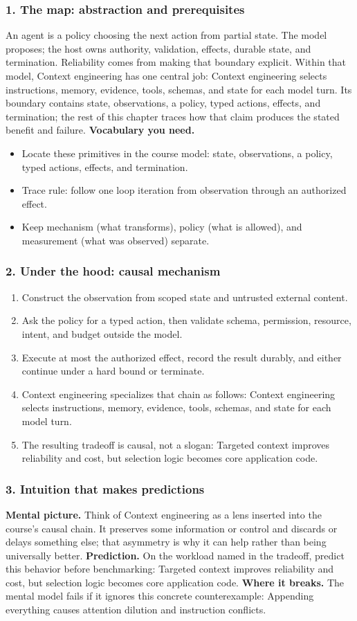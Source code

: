 \subsubsection*{1. The map: abstraction and prerequisites}
An agent is a policy choosing the next action from partial state. The model proposes; the host owns authority, validation, effects, durable state, and termination. Reliability comes from making that boundary explicit.
Within that model, Context engineering has one central job: Context engineering selects instructions, memory, evidence, tools, schemas, and state for each model turn. Its boundary contains state, observations, a policy, typed actions, effects, and termination; the rest of this chapter traces how that claim produces the stated benefit and failure.
\textbf{Vocabulary you need.}\begin{itemize}
\item Locate these primitives in the course model: state, observations, a policy, typed actions, effects, and termination.
\item Trace rule: follow one loop iteration from observation through an authorized effect.
\item Keep mechanism (what transforms), policy (what is allowed), and measurement (what was observed) separate.
\end{itemize}
\subsubsection*{2. Under the hood: causal mechanism}\begin{enumerate}
\item Construct the observation from scoped state and untrusted external content.
\item Ask the policy for a typed action, then validate schema, permission, resource, intent, and budget outside the model.
\item Execute at most the authorized effect, record the result durably, and either continue under a hard bound or terminate.
\item Context engineering specializes that chain as follows: Context engineering selects instructions, memory, evidence, tools, schemas, and state for each model turn.
\item The resulting tradeoff is causal, not a slogan: Targeted context improves reliability and cost, but selection logic becomes core application code.
\end{enumerate}
\subsubsection*{3. Intuition that makes predictions}
\textbf{Mental picture.} Think of Context engineering as a lens inserted into the course's causal chain. It preserves some information or control and discards or delays something else; that asymmetry is why it can help rather than being universally better.
\textbf{Prediction.} On the workload named in the tradeoff, predict this behavior before benchmarking: Targeted context improves reliability and cost, but selection logic becomes core application code.
\textbf{Where it breaks.} The mental model fails if it ignores this concrete counterexample: Appending everything causes attention dilution and instruction conflicts.
